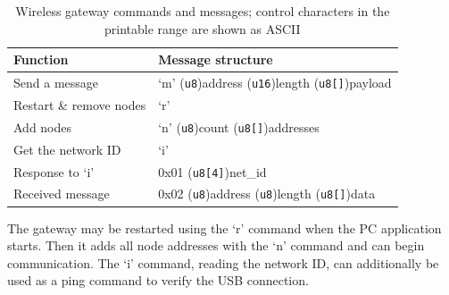 \begin{table}[h]
	\centering
	\begin{tabulary}{\textwidth}{lL}
		\toprule
		\textbf{Function} & \textbf{Message structure} \\
		\midrule
		Send a message & `m' (\verb|u8|)address (\verb|u16|)length (\verb|u8[]|)payload \\
		Restart \& remove nodes &  `r' \\
		Add nodes &  `n' (\verb|u8|)count (\verb|u8[]|)addresses \\
		Get the network ID &  `i' \\
		Response to `i' & 0x01 (\verb|u8[4]|)net\_id \\
		Received message & 0x02 (\verb|u8|)address (\verb|u8|)length (\verb|u8[]|)data \\
		\bottomrule
	\end{tabulary}
	\caption[Wireless gateway commands and messages]{\label{fig:rf-dongle-commands}Wireless gateway commands and messages; control characters in the printable range are shown as ASCII}
\end{table}

The gateway may be restarted using the `r' command when the \gls{PC} application starts. Then it adds all node addresses with the `n' command and can begin communication. The `i' command, reading the network ID, can additionally be used as a ping command to verify the \gls{USB} connection.































